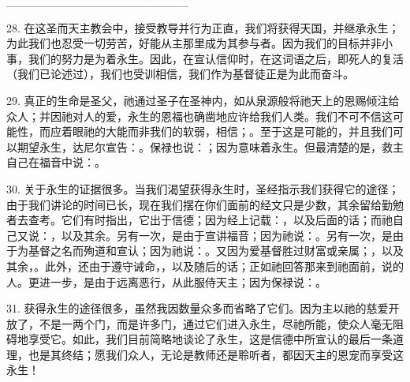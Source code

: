 \_\_\_\_\_\_\_\_\_\_\_\_\_\_\_\_\_\_\_\_\_\_\par

28. 在这圣而天主教会中，接受教导并行为正直，我们将获得天国，并继承永生；为此我们也忍受一切劳苦，好能从主那里成为其参与者。因为我们的目标并非小事，我们的努力是为着永生。因此，在宣认信仰时，在这词语之后，即死人的复活（我们已论述过），我们也受训相信，我们作为基督徒正是为此而奋斗。\par

29. 真正的生命是圣父，祂通过圣子在圣神内，如从泉源般将祂天上的恩赐倾注给众人；并因祂对人的爱，永生的恩福也确凿地应许给我们人类。我们不可不信这可能性，而应着眼祂的大能而非我们的软弱，相信；。至于这是可能的，并且我们可以期望永生，达尼尔宣告：。保禄也说：；因为意味着永生。但最清楚的是，救主自己在福音中说：。\par

30. 关于永生的证据很多。当我们渴望获得永生时，圣经指示我们获得它的途径；由于我们讲论的时间已长，现在我们摆在你们面前的经文只是少数，其余留给勤勉者去查考。它们有时指出，它出于信德；因为经上记载：，以及后面的话；而祂自己又说：，以及其余。另有一次，是由于宣讲福音；因为祂说：。另有一次，是由于为基督之名而殉道和宣认；因为祂说：。又因为爱基督胜过财富或亲属；，以及其余，。此外，还由于遵守诫命，，以及随后的话；正如祂回答那来到祂面前，说的人。更进一步，是由于远离恶行，从此服侍天主；因为保禄说：。\par

31. 获得永生的途径很多，虽然我因数量众多而省略了它们。因为主以祂的慈爱开放了，不是一两个门，而是许多门，通过它们进入永生，尽祂所能，使众人毫无阻碍地享受它。如此，我们目前简略地谈论了永生，这是信德中所宣认的最后一条道理，也是其终结；愿我们众人，无论是教师还是聆听者，都因天主的恩宠而享受这永生！\par

